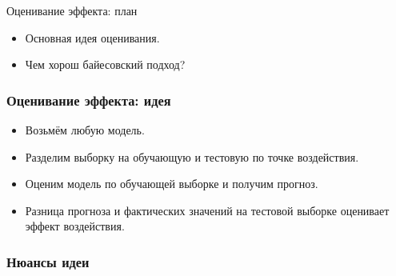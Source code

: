
\begin{frame} %


\end{frame}



\begin{frame}{Оценивание эффекта: план}
  \begin{itemize}[<+->]
    \item Основная идея оценивания.
    \item Чем хорош байесовский подход?
  \end{itemize}

\end{frame}


\begin{frame}
  \frametitle{Оценивание эффекта: идея}

  \begin{itemize}[<+->]
    \item Возьмём \alert{любую} модель. 
    
    \item Разделим выборку на обучающую и тестовую \alert{по точке 
    воздействия}. 
    \item Оценим модель по обучающей выборке и \alert{получим прогноз}.
    \item \alert{Разница} прогноза и фактических значений на тестовой выборке 
    оценивает эффект воздействия.  
  \end{itemize}

\end{frame}


\begin{frame}
  \frametitle{Нюансы идеи}

  \begin{itemize}


    

\end{itemize}

\end{frame}


